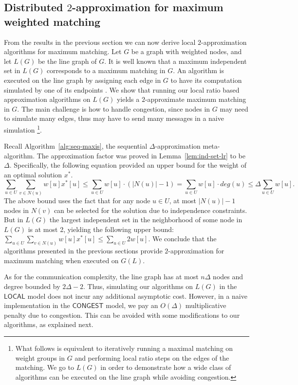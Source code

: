 \documentclass[11pt]{article}
\begin{document}
\subsection{Distributed $2$-approximation for maximum weighted matching}
\label{sec:2MM}
From the results in the previous section we can now derive local $2$-approximation algorithms for maximum matching. Let $G$ be a graph with weighted nodes, and let $L(G)$ be the line graph of $G$. 
It is well known that a maximum independent set in $L(G)$ corresponds to a maximum matching in $G$. An algorithm is executed on the line graph by assigning each edge in $G$ to have its computation simulated by one of its endpoints \cite{kuhn2005price}. We show that running our local ratio based approximation algorithms on $L(G)$ yields a $2$-approximate maximum matching in $G$. The main challenge is how to handle congestion, since nodes in $G$ may need to simulate many edges, thus may have to send many messages in a naive simulation \footnote{What follows is equivalent to iteratively running a maximal matching on weight groups in $G$ and performing local ratio steps on the edges of the matching. We go to $L(G)$ in order to demonstrate how a wide class of algorithms can be executed on the line graph while avoiding congestion.}.

Recall Algorithm~\ref{alg:seq-maxis}, the sequential $\Delta$-approximation meta-algorithm. The approximation factor was proved in Lemma~\ref{lem:ind-set-lr} to be $\Delta$. Specifically, the following equation provided an upper bound for the weight of an optimal solution $x^*$.
	$$\sum_{u\in U}\sum_{v \in N(u)} w[u]x^*[u] \leq \sum_{u\in U} w[u]\cdot (|N(u)|-1) = \sum_{u\in U} w[u]\cdot deg(u) \leq \Delta\sum_{u\in U} w[u].$$
The above bound uses the fact that for any node $u\in U$, at most $|N(u)|-1$ nodes in $N(v)$ can be selected for the solution due to independence constraints. But in $L(G)$ the largest independent set in the neighborhood of some node in $L(G)$ is at most 2, yielding the following upper bound:
	$\sum_{u\in U}\sum_{v \in N(u)} w[u]x^*[u] \leq \sum_{u\in U} 2w[u].$
We conclude that the algorithms presented in the previous sections provide $2$-approximation for maximum matching when executed on $G(L)$.

As for the communication complexity, the line graph has at most $n\Delta$ nodes and degree bounded by $2\Delta-2$. Thus, simulating our algorithms on $L(G)$ in the $\mathsf{LOCAL}$ model does not incur any additional asymptotic cost. However, in a naive implementation in the $\mathsf{CONGEST}$ model, we pay an $O(\Delta)$ multiplicative penalty due to congestion. This can be avoided with some modifications to our algorithms, as explained next.
\end{document}
